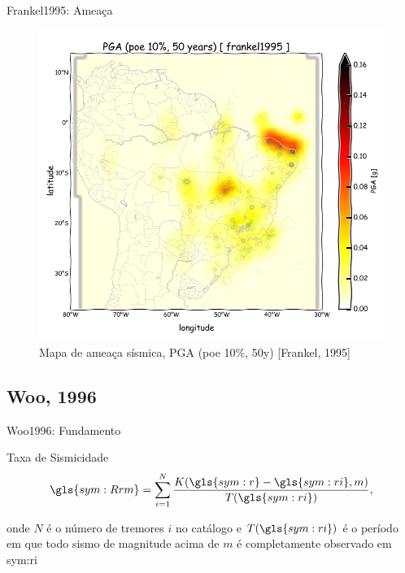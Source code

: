 \documentclass[ucs,8pt]{beamer}
\begin{document}
\begin{frame}{Frankel1995: Ameaça}
\begin{figure}[H]
  \centering
  \includegraphics[height=.95\textheight]{pga_frankel} 
  \caption{Mapa de ameaça sísmica, PGA (poe 10\%, 50y) [Frankel, 1995] }
  \label{fig:pga_fran} 
\end{figure}
\end{frame}





\subsection{Woo, 1996}


\begin{frame}{Woo1996: Fundamento}
	\begin{block}{Taxa de Sismicidade}
		\begin{equation}
			\ensuremath{
				\gls{sym:Rrm} = \sum_{i=1}^{N} \frac{ K(\gls{sym:r} - \gls{sym:ri}, m)}
													{T({\gls{sym:ri})}},
			}
			\label{eq:Rrm}
		\end{equation}
	\end{block}
	onde $N$ é o número de tremores $i$ no catálogo 
	e $T(\gls{sym:ri})$ é o período em que todo sismo de magnitude acima de $m$ é completamente observado 
	em \gls{sym:ri}
\end{frame}
\end{document}
